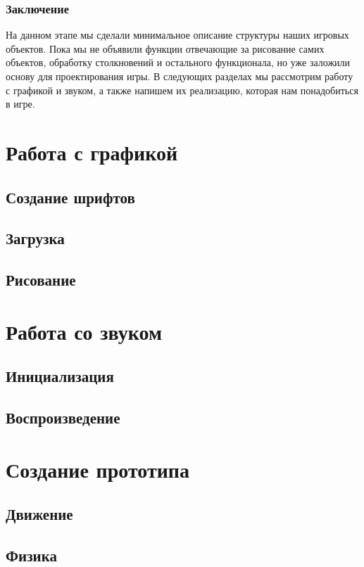 \subsection{Заключение}
На данном этапе мы сделали минимальное описание структуры наших игровых объектов. Пока мы не объявили 
функции отвечающие за рисование самих объектов, обработку столкновений и остального функционала, но уже 
заложили основу для проектирования игры. В следующих разделах мы рассмотрим работу с графикой и звуком, а 
также напишем их реализацию, которая нам понадобиться в игре.

\pagebreak

\chapter{Работа с графикой} %
\section{Создание шрифтов}
\section{Загрузка}
\section{Рисование}

\chapter{Работа со звуком} %
\section{Инициализация}
\section{Воспроизведение}

\chapter{Создание прототипа}
\section{Движение}
\section{Физика}
